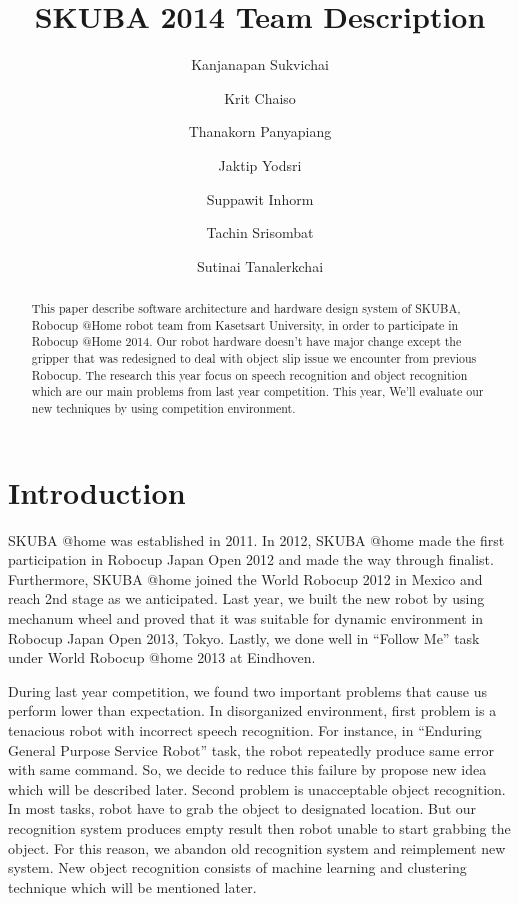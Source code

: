 \documentclass{llncs}
\newcommand{\dq}[1]{``#1''}
\begin{document}
\title{SKUBA 2014 Team Description}
\author{Kanjanapan Sukvichai
\and Krit Chaiso
\and Thanakorn Panyapiang
\and Jaktip Yodsri
\and Suppawit Inhorm
\and Tachin Srisombat
\and Sutinai Tanalerkchai
}


\maketitle

\begin{abstract}
This paper describe software architecture and hardware design system of SKUBA, Robocup @Home robot team from Kasetsart University, in order to participate in Robocup @Home 2014. Our robot hardware doesn't have major change except the gripper that was redesigned to deal with object slip issue we encounter from previous Robocup. The research this year focus on speech recognition and object recognition which are our main problems from last year competition. This year, We'll evaluate our new techniques by using competition environment.
\end{abstract}

\section{Introduction}

SKUBA @home was established in 2011. In 2012, SKUBA @home made the first participation in Robocup Japan Open 2012 and made the way through finalist. Furthermore, SKUBA @home joined the World Robocup 2012 in Mexico and reach 2nd stage as we anticipated. Last year, we built the new robot by using mechanum wheel and proved that it was suitable for dynamic environment in Robocup Japan Open 2013, Tokyo. Lastly, we done well in \dq{Follow Me} task under World Robocup @home 2013 at Eindhoven.

During last year competition, we found two important problems that cause us perform lower than expectation. In disorganized environment, first problem is a tenacious robot with incorrect speech recognition. For instance, in \dq{Enduring General Purpose Service Robot} task, the robot repeatedly produce same error with same command. So, we decide to reduce this failure by propose new idea which will be described later. Second problem is unacceptable object recognition. In most tasks, robot have to grab the object to designated location. But our recognition system produces empty result then robot unable to start grabbing the object. For this reason, we abandon old recognition system and reimplement new system. New object recognition consists of machine learning and clustering technique which will be mentioned later.
\end{document}
